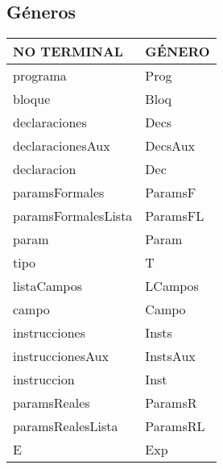 \documentclass[11pt]{article}
\begin{document}
        \subsection{Géneros}
        \begin{longtable}{|p{6cm}|p{6cm}|}
            \hline
            \textbf{NO TERMINAL} & \textbf{GÉNERO} \\
            \hline
            programa & Prog \\
            \hline
            bloque & Bloq \\
            \hline
            declaraciones & Decs \\
            \hline
            declaracionesAux & DecsAux \\
            \hline
            declaracion & Dec \\
            \hline
            paramsFormales & ParamsF \\
            \hline
            paramsFormalesLista & ParamsFL \\
            \hline
            param & Param \\
            \hline
            tipo & T \\
            \hline
            listaCampos & LCampos \\
            \hline
            campo & Campo \\
            \hline
            instrucciones & Insts \\
            \hline
            instruccionesAux & InstsAux \\
            \hline
            instruccion & Inst \\
            \hline
            paramsReales & ParamsR \\
            \hline
            paramsRealesLista & ParamsRL \\
            \hline
            E & Exp \\
            \hline
        \end{longtable}
\end{document}
